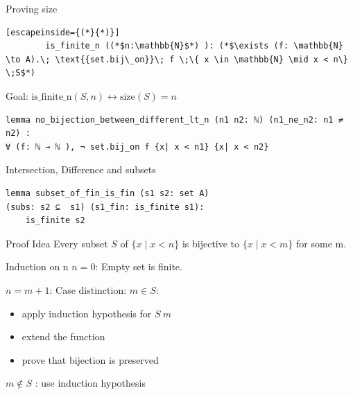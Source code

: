 \documentclass{beamer}
\begin{document}
\begin{frame}[fragile]{Proving size} 
    \begin{lstlisting}[escapeinside={(*}{*)}]  
        is_finite_n ((*$n:\mathbb{N}$*) ): (*$\exists (f: \mathbb{N} \to A).\; \text{{set.bij\_on}}\; f \;\{ x \in \mathbb{N} \mid x < n\} \;S$*)
    \end{lstlisting}

    Goal: $\text{is\_finite\_n}(S, n) \leftrightarrow \text{size}(S) = n$

    \begin{lstlisting}
lemma no_bijection_between_different_lt_n (n1 n2: ℕ) (n1_ne_n2: n1 ≠ n2) :
∀ (f: ℕ → ℕ ), ¬ set.bij_on f {x| x < n1} {x| x < n2}
    \end{lstlisting}
    
\end{frame}

\begin{frame}[fragile]{Intersection, Difference and subsets}
    \begin{lstlisting}[aboveskip=0pt, belowskip=0pt]
lemma subset_of_fin_is_fin (s1 s2: set A) 
(subs: s2 ⊆  s1) (s1_fin: is_finite s1):
    is_finite s2
    \end{lstlisting}\begin{block}{Proof Idea}
        Every subset $S$ of $\{x \mid x < n\}$ is bijective to $\{x \mid x < m\}$ for some m.
        
        Induction on n
        $n=0$: Empty set is finite.

        $n=m+1$: Case distinction: $m \in S$:
            \begin{itemize}
                \item apply induction hypothesis for $S \ {m}$
                \item extend the function
                \item prove that bijection is preserved
            \end{itemize}
            $m \not \in S$ : use induction hypothesis
    \end{block}

\end{frame}
\end{document}

